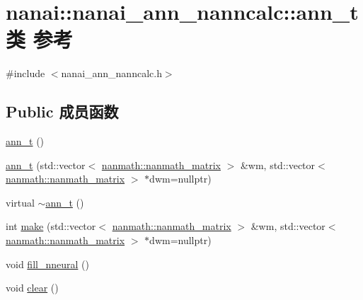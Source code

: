 \hypertarget{classnanai_1_1nanai__ann__nanncalc_1_1ann__t}{}\section{nanai\+:\+:nanai\+\_\+ann\+\_\+nanncalc\+:\+:ann\+\_\+t类 参考}
\label{classnanai_1_1nanai__ann__nanncalc_1_1ann__t}


{\ttfamily \#include $<$nanai\+\_\+ann\+\_\+nanncalc.\+h$>$}

\subsection*{Public 成员函数}
\begin{DoxyCompactItemize}
\item 
\hyperlink{classnanai_1_1nanai__ann__nanncalc_1_1ann__t_ac515917b099f147e2a27554fc21e27be}{ann\+\_\+t} ()
\item 
\hyperlink{classnanai_1_1nanai__ann__nanncalc_1_1ann__t_ae7afd80669ae15785019431171f791c6}{ann\+\_\+t} (std\+::vector$<$ \hyperlink{classnanmath_1_1nanmath__matrix}{nanmath\+::nanmath\+\_\+matrix} $>$ \&wm, std\+::vector$<$ \hyperlink{classnanmath_1_1nanmath__matrix}{nanmath\+::nanmath\+\_\+matrix} $>$ $\ast$dwm=nullptr)
\item 
virtual \hyperlink{classnanai_1_1nanai__ann__nanncalc_1_1ann__t_a73fe38762c283afdb7980b9909124daf}{$\sim$ann\+\_\+t} ()
\item 
int \hyperlink{classnanai_1_1nanai__ann__nanncalc_1_1ann__t_a20e243d38063b430a487f870416457e5}{make} (std\+::vector$<$ \hyperlink{classnanmath_1_1nanmath__matrix}{nanmath\+::nanmath\+\_\+matrix} $>$ \&wm, std\+::vector$<$ \hyperlink{classnanmath_1_1nanmath__matrix}{nanmath\+::nanmath\+\_\+matrix} $>$ $\ast$dwm=nullptr)
\item 
void \hyperlink{classnanai_1_1nanai__ann__nanncalc_1_1ann__t_a8484fa61fc90ea80626e16eb28a6b963}{fill\+\_\+nneural} ()
\item 
void \hyperlink{classnanai_1_1nanai__ann__nanncalc_1_1ann__t_acbeda89aa6636ea5e0e7d2ee711baaba}{clear} ()
\end{DoxyCompactItemize}
